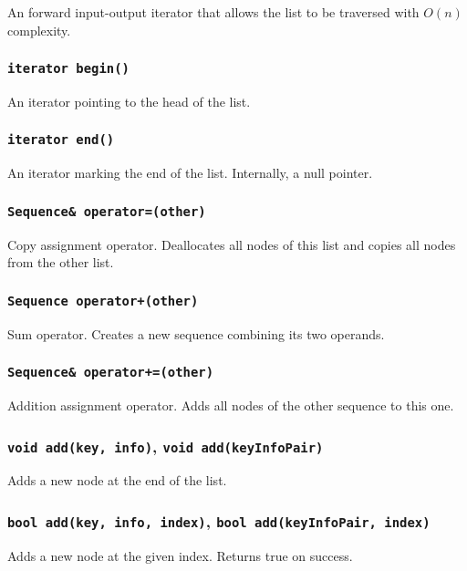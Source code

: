 ﻿\documentclass{article}
\begin{document}
An forward input-output iterator that allows the list to be traversed with $O(n)$ complexity.

\subsubsection{{\tt iterator begin()}}

An iterator pointing to the head of the list.

\subsubsection{{\tt iterator end()}}

An iterator marking the end of the list. Internally, a null pointer.

\subsubsection{{\tt Sequence\& operator=(other)}}

Copy assignment operator. Deallocates all nodes of this list and copies all nodes from the other list.

\subsubsection{{\tt Sequence operator+(other)}}

Sum operator. Creates a new sequence combining its two operands.

\subsubsection{{\tt Sequence\& operator+=(other)}}

Addition assignment operator. Adds all nodes of the other sequence to this one.

\subsubsection{{\tt void add(key, info)}, {\tt void add(keyInfoPair)}}

Adds a new node at the end of the list.

\subsubsection{{\tt bool add(key, info, index)}, {\tt bool add(keyInfoPair, index)}}

Adds a new node at the given index. Returns true on success.
\end{document}
